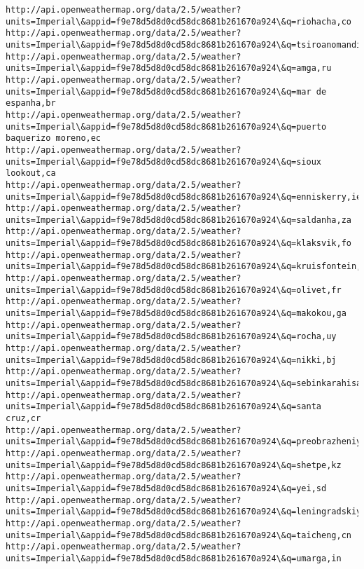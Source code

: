 \documentclass[11pt]{article}
\begin{document}
\begin{Verbatim}[commandchars=\\\{\}]
http://api.openweathermap.org/data/2.5/weather?units=Imperial\&appid=f9e78d5d8d0cd58dc8681b261670a924\&q=riohacha,co
http://api.openweathermap.org/data/2.5/weather?units=Imperial\&appid=f9e78d5d8d0cd58dc8681b261670a924\&q=tsiroanomandidy,mg
http://api.openweathermap.org/data/2.5/weather?units=Imperial\&appid=f9e78d5d8d0cd58dc8681b261670a924\&q=amga,ru
http://api.openweathermap.org/data/2.5/weather?units=Imperial\&appid=f9e78d5d8d0cd58dc8681b261670a924\&q=mar de espanha,br
http://api.openweathermap.org/data/2.5/weather?units=Imperial\&appid=f9e78d5d8d0cd58dc8681b261670a924\&q=puerto baquerizo moreno,ec
http://api.openweathermap.org/data/2.5/weather?units=Imperial\&appid=f9e78d5d8d0cd58dc8681b261670a924\&q=sioux lookout,ca
http://api.openweathermap.org/data/2.5/weather?units=Imperial\&appid=f9e78d5d8d0cd58dc8681b261670a924\&q=enniskerry,ie
http://api.openweathermap.org/data/2.5/weather?units=Imperial\&appid=f9e78d5d8d0cd58dc8681b261670a924\&q=saldanha,za
http://api.openweathermap.org/data/2.5/weather?units=Imperial\&appid=f9e78d5d8d0cd58dc8681b261670a924\&q=klaksvik,fo
http://api.openweathermap.org/data/2.5/weather?units=Imperial\&appid=f9e78d5d8d0cd58dc8681b261670a924\&q=kruisfontein,za
http://api.openweathermap.org/data/2.5/weather?units=Imperial\&appid=f9e78d5d8d0cd58dc8681b261670a924\&q=olivet,fr
http://api.openweathermap.org/data/2.5/weather?units=Imperial\&appid=f9e78d5d8d0cd58dc8681b261670a924\&q=makokou,ga
http://api.openweathermap.org/data/2.5/weather?units=Imperial\&appid=f9e78d5d8d0cd58dc8681b261670a924\&q=rocha,uy
http://api.openweathermap.org/data/2.5/weather?units=Imperial\&appid=f9e78d5d8d0cd58dc8681b261670a924\&q=nikki,bj
http://api.openweathermap.org/data/2.5/weather?units=Imperial\&appid=f9e78d5d8d0cd58dc8681b261670a924\&q=sebinkarahisar,tr
http://api.openweathermap.org/data/2.5/weather?units=Imperial\&appid=f9e78d5d8d0cd58dc8681b261670a924\&q=santa cruz,cr
http://api.openweathermap.org/data/2.5/weather?units=Imperial\&appid=f9e78d5d8d0cd58dc8681b261670a924\&q=preobrazheniye,ru
http://api.openweathermap.org/data/2.5/weather?units=Imperial\&appid=f9e78d5d8d0cd58dc8681b261670a924\&q=shetpe,kz
http://api.openweathermap.org/data/2.5/weather?units=Imperial\&appid=f9e78d5d8d0cd58dc8681b261670a924\&q=yei,sd
http://api.openweathermap.org/data/2.5/weather?units=Imperial\&appid=f9e78d5d8d0cd58dc8681b261670a924\&q=leningradskiy,ru
http://api.openweathermap.org/data/2.5/weather?units=Imperial\&appid=f9e78d5d8d0cd58dc8681b261670a924\&q=taicheng,cn
http://api.openweathermap.org/data/2.5/weather?units=Imperial\&appid=f9e78d5d8d0cd58dc8681b261670a924\&q=umarga,in

\end{Verbatim}
\end{document}
